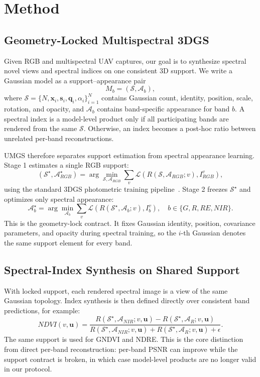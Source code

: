 \section{Method}

\subsection{Geometry-Locked Multispectral 3DGS}

Given RGB and multispectral UAV captures, our goal is to synthesize spectral novel views and spectral indices on one consistent 3D support. We write a Gaussian model as a support--appearance pair
\[
    M_b = (\mathcal{S}, \mathcal{A}_b),
\]
where $\mathcal{S}=\{N,\mathbf{x}_i,\mathbf{s}_i,\mathbf{q}_i,\alpha_i\}_{i=1}^{N}$ contains Gaussian count, identity, position, scale, rotation, and opacity, and $\mathcal{A}_b$ contains band-specific appearance for band $b$. A spectral index is a model-level product only if all participating bands are rendered from the same $\mathcal{S}$. Otherwise, an index becomes a post-hoc ratio between unrelated per-band reconstructions.

UMGS therefore separates support estimation from spectral appearance learning. Stage 1 estimates a single RGB support:
\[
    (\mathcal{S}^{\star}, \mathcal{A}_{RGB}^{\star})
    =
    \arg\min_{\mathcal{S},\mathcal{A}_{RGB}}
    \sum_{v}\mathcal{L}\!\left(R(\mathcal{S},\mathcal{A}_{RGB};v), I_{RGB}^{v}\right),
\]
using the standard 3DGS photometric training pipeline~\cite{kerbl2023gaussiansplatting}. Stage 2 freezes $\mathcal{S}^{\star}$ and optimizes only spectral appearance:
\[
    \mathcal{A}_{b}^{\star}
    =
    \arg\min_{\mathcal{A}_{b}}
    \sum_{v}\mathcal{L}\!\left(R(\mathcal{S}^{\star},\mathcal{A}_{b};v), I_{b}^{v}\right),
    \quad b\in\{G,R,RE,NIR\}.
\]
This is the geometry-lock contract. It fixes Gaussian identity, position, covariance parameters, and opacity during spectral training, so the $i$-th Gaussian denotes the same support element for every band.

\subsection{Spectral-Index Synthesis on Shared Support}

With locked support, each rendered spectral image is a view of the same Gaussian topology. Index synthesis is then defined directly over consistent band predictions, for example:
\[
    NDVI(v,\mathbf{u}) =
    \frac{R(\mathcal{S}^{\star},\mathcal{A}_{NIR};v,\mathbf{u}) -
          R(\mathcal{S}^{\star},\mathcal{A}_{R};v,\mathbf{u})}
         {R(\mathcal{S}^{\star},\mathcal{A}_{NIR};v,\mathbf{u}) +
          R(\mathcal{S}^{\star},\mathcal{A}_{R};v,\mathbf{u}) + \epsilon}.
\]
The same support is used for GNDVI and NDRE. This is the core distinction from direct per-band reconstruction: per-band PSNR can improve while the support contract is broken, in which case model-level products are no longer valid in our protocol.

